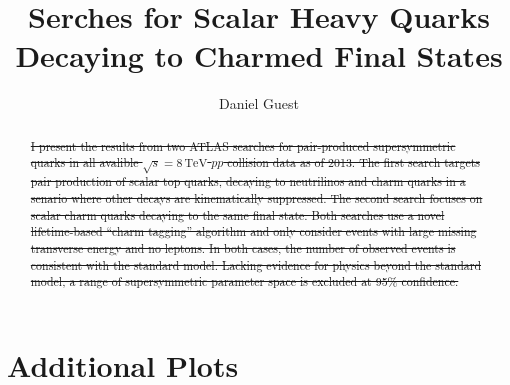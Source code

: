 \documentclass{report}
\title{Serches for Scalar Heavy Quarks Decaying to Charmed Final States}
\author{Daniel Guest}
\newcommand{\cmenergy}{\sqrt{s} = 8\,\text{TeV}}
\begin{document}
\maketitle
\tableofcontents

\begin{abstract}
\sout{I present the results from two ATLAS searches for pair-produced
supersymmetric quarks in all avalible $\cmenergy$ $pp$ collision data as
of 2013. The first search targets pair production of scalar top quarks,
decaying to neutrilinos and charm quarks in a senario where other
decays are kinematically suppressed. The second search focuses
on scalar charm quarks decaying to the same final state. Both searches
use a novel lifetime-based ``charm tagging'' algorithm
and only consider events with large missing transverse
energy and no leptons. In both cases, the number of observed events is
consistent with the standard model. Lacking evidence for physics
beyond the standard model, a range of supersymmetric parameter space is
excluded at 95\% confidence.}
\end{abstract}






\appendix
\appendixpage
\addappheadtotoc

\chapter{Additional Plots}





\end{document}
